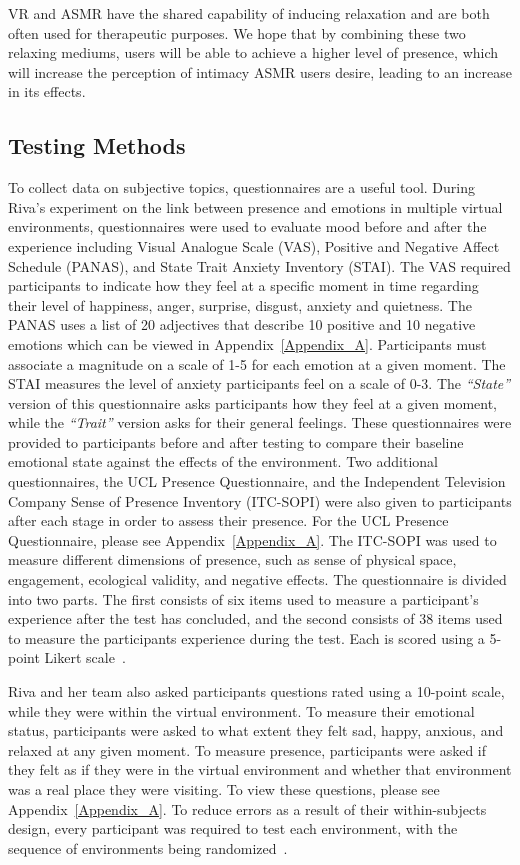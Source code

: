 \documentclass{sigchi}
\newcommand{\inlinequote}[1]{\textit{``#1''}}
\begin{document}
VR and ASMR have the shared capability of inducing relaxation and are both often used for therapeutic purposes. We hope that by combining these two relaxing mediums, users will be able to achieve a higher level of presence, which will increase the perception of intimacy ASMR users desire, leading to an increase in its effects.

\subsection{Testing Methods}
To collect data on subjective topics, questionnaires are a useful tool. During Riva's experiment on the link between presence and emotions in multiple virtual environments, questionnaires were used to evaluate mood before and after the experience including Visual Analogue Scale (VAS), Positive and Negative Affect Schedule (PANAS), and State Trait Anxiety Inventory (STAI). The VAS required participants to indicate how they feel at a specific moment in time regarding their level of happiness, anger, surprise, disgust, anxiety and quietness. The PANAS uses a list of 20 adjectives that describe 10 positive and 10 negative emotions which can be viewed in Appendix~\ref{Appendix_A}. Participants must associate a magnitude on a scale of 1-5 for each emotion at a given moment. The STAI measures the level of anxiety participants feel on a scale of 0-3. The \inlinequote{State} version of this questionnaire asks participants how they feel at a given moment, while the \inlinequote{Trait} version asks for their general feelings. These questionnaires were provided to participants before and after testing to compare their baseline emotional state against the effects of the environment. Two additional questionnaires, the UCL Presence Questionnaire, and the Independent Television Company Sense of Presence Inventory (ITC-SOPI) were also given to participants after each stage in order to assess their presence. For the UCL Presence Questionnaire, please see Appendix~\ref{Appendix_A}.
The ITC-SOPI was used to measure different dimensions of presence, such as sense of physical space, engagement, ecological validity, and negative effects. The questionnaire is divided into two parts. The first consists of six items used to measure a participant's experience after the test has concluded, and the second consists of 38 items used to measure the participants experience during the test. Each is scored using a 5-point Likert scale~\cite{riva2007affective}.

Riva and her team also asked participants questions rated using a 10-point scale, while they were within the virtual environment. To measure their emotional status, participants were asked to what extent they felt sad, happy, anxious, and relaxed at any given moment. To measure presence, participants were asked if they felt as if they were in the virtual environment and whether that environment was a real place they were visiting. To view these questions, please see Appendix~\ref{Appendix_A}.
To reduce errors as a result of their within-subjects design, every participant was required to test each environment, with the sequence of environments being randomized~\cite{riva2007affective}.
\end{document}
